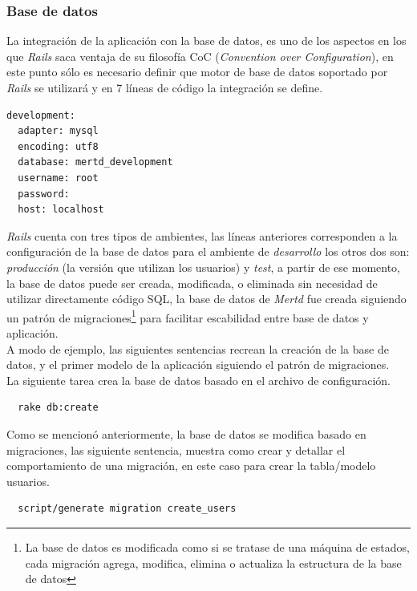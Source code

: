 \subsubsection{Base de datos}

La integración de la aplicación con la base de datos, es uno de los aspectos en los que \emph{Rails} saca ventaja de su filosofía CoC (\emph{Convention over Configuration}), en este punto sólo es necesario definir que motor de base de datos soportado por \emph{Rails} se utilizará y en 7 líneas de código la integración se define.

\begin{verbatim}
development: 
  adapter: mysql 
  encoding: utf8 
  database: mertd_development 
  username: root 
  password: 
  host: localhost	
\end{verbatim}

\emph{Rails} cuenta con tres tipos de ambientes, las líneas anteriores corresponden a la configuración de la base de datos para el ambiente de \emph{desarrollo} los otros dos son: \emph{producción} (la versión que utilizan los usuarios) y \emph{test}, a partir de ese momento, la base de datos puede ser creada, modificada, o eliminada sin necesidad de utilizar directamente código SQL, la base de datos de \emph{Mertd} fue creada siguiendo un patrón de migraciones\cite{ror:cookbook}\footnote{La base de datos es modificada como si se tratase de una máquina de estados, cada migración agrega, modifica, elimina o actualiza la estructura de la base de datos} para facilitar escabilidad entre base de datos y aplicación.\\

A modo de ejemplo, las siguientes sentencias recrean la creación de la base de datos, y el primer modelo de la aplicación siguiendo el patrón de migraciones.\\

La siguiente tarea crea la base de datos basado en el archivo de configuración.

\begin{verbatim}
  rake db:create 
\end{verbatim}

Como se mencionó anteriormente, la base de datos se modifica basado en migraciones, las siguiente sentencia, muestra como crear y detallar el comportamiento de una migración, en este caso para crear la tabla/modelo usuarios. 

\begin{verbatim}
  script/generate migration create_users
\end{verbatim}

